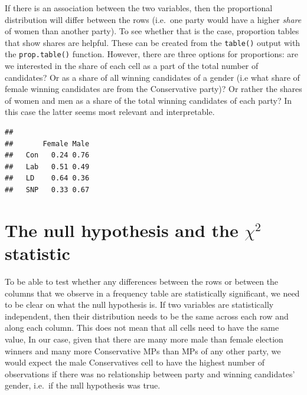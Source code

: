 \documentclass[
]{book}
\newenvironment{Shaded}{\begin{snugshade}}{\end{snugshade}}
\newcommand{\CommentTok}[1]{\textcolor[rgb]{0.56,0.35,0.01}{\textit{#1}}}
\newcommand{\DataTypeTok}[1]{\textcolor[rgb]{0.13,0.29,0.53}{#1}}
\newcommand{\DecValTok}[1]{\textcolor[rgb]{0.00,0.00,0.81}{#1}}
\newcommand{\KeywordTok}[1]{\textcolor[rgb]{0.13,0.29,0.53}{\textbf{#1}}}
\newcommand{\NormalTok}[1]{#1}
\newcommand{\OperatorTok}[1]{\textcolor[rgb]{0.81,0.36,0.00}{\textbf{#1}}}
\newcommand{\StringTok}[1]{\textcolor[rgb]{0.31,0.60,0.02}{#1}}
\begin{document}
If there is an association between the two variables, then the proportional distribution will differ between the rows (i.e.~one party would have a higher \emph{share} of women than another party). To see whether that is the case, proportion tables that show shares are helpful. These can be created from the \texttt{table()} output with the \texttt{prop.table()} function. However, there are three options for proportions: are we interested in the share of each cell as a part of the total number of candidates? Or as a share of all winning candidates of a gender (i.e what share of female winning candidates are from the Conservative party)? Or rather the shares of women and men as a share of the total winning candidates of each party? In this case the latter seems most relevant and interpretable.

\begin{Shaded}
\end{Shaded}

\begin{verbatim}
##      
##       Female Male
##   Con   0.24 0.76
##   Lab   0.51 0.49
##   LD    0.64 0.36
##   SNP   0.33 0.67
\end{verbatim}

\hypertarget{the-null-hypothesis-and-the-chi2-statistic}{%
\section{\texorpdfstring{The null hypothesis and the \(\chi^2\) statistic}{The null hypothesis and the \textbackslash chi\^{}2 statistic}}\label{the-null-hypothesis-and-the-chi2-statistic}}

To be able to test whether any differences between the rows or between the columns that we observe in a frequency table are statistically significant, we need to be clear on what the null hypothesis is. If two variables are statistically independent, then their distribution needs to be the same across each row and along each column. This does not mean that all cells need to have the same value, In our case, given that there are many more male than female election winners and many more Conservative MPs than MPs of any other party, we would expect the male Conservatives cell to have the highest number of observations if there was no relationship between party and winning candidates' gender, i.e.~if the null hypothesis was true.
\end{document}
